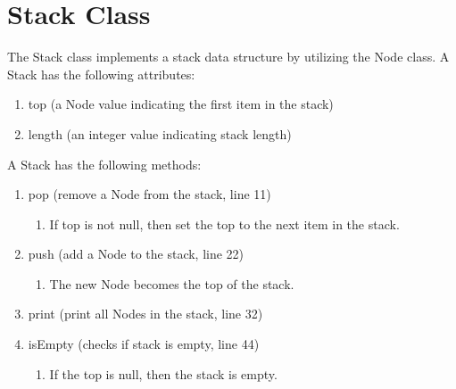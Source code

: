 \documentclass[letterpaper, 10pt,DIV=13]{scrartcl}
\numberwithin{equation}{section} %
\numberwithin{figure}{section} %
\numberwithin{table}{section} %
\begin{document}


\section{Stack Class}
The Stack class implements a stack data structure by utilizing the Node class. A Stack has the following attributes:
\begin{enumerate}
    \item top (a Node value indicating the first item in the stack)
    \item length (an integer value indicating stack length)
\end{enumerate}

A Stack has the following methods: 
\begin{enumerate}
    \item pop (remove a Node from the stack, line 11) 
        \begin{enumerate}
            \item If top is not null, then set the top to the next item in the stack.
        \end{enumerate}
    \item push (add a Node to the stack, line 22)
        \begin{enumerate}
            \item The new Node becomes the top of the stack.
        \end{enumerate}
    \item print (print all Nodes in the stack, line 32)
    \item isEmpty (checks if stack is empty, line 44)
        \begin{enumerate}
            \item If the top is null, then the stack is empty.
        \end{enumerate}
\end{enumerate}
\end{document}
